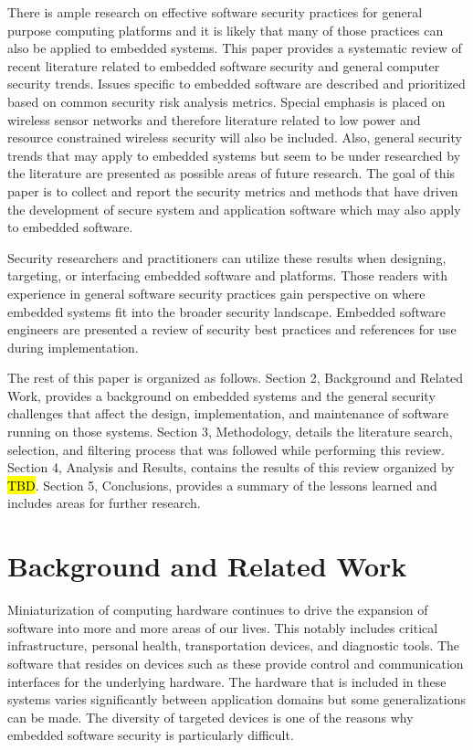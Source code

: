 \documentclass[final,conference,10pt]{IEEEtran}
\begin{document}
There is ample research on effective software security practices for general purpose computing platforms and it is likely that many of those practices can also be applied to embedded systems. This paper provides a systematic review of recent literature related to embedded software security and general computer security trends. Issues specific to embedded software are described and prioritized based on common security risk analysis metrics.  Special emphasis is placed on wireless sensor networks and therefore literature related to low power and resource constrained wireless security will also be included.  Also, general security trends that may apply to embedded systems but seem to be under researched by the literature are presented as possible areas of future research.  The goal of this paper is to collect and report the security metrics and methods that have driven the development of secure system and application software which may also apply to embedded software.

Security researchers and practitioners can utilize these results when designing, targeting, or interfacing embedded software and platforms.  Those readers with experience in general software security practices gain perspective on where embedded systems fit into the broader security landscape.  Embedded software engineers are presented a review of security best practices and references for use during implementation.

The rest of this paper is organized as follows. Section 2, Background and Related Work, provides a background on embedded systems and the general security challenges that affect the design, implementation, and maintenance of software running on those systems. Section 3, Methodology, details the literature search, selection, and filtering process that was followed while performing this review. Section 4, Analysis and Results, contains the results of this review organized by \hl{TBD}. Section 5, Conclusions, provides a summary of the lessons learned and includes areas for further research.

\section{Background and Related Work}
Miniaturization of computing hardware continues to drive the expansion of software into more and more areas of our lives.  This notably includes critical infrastructure, personal health, transportation devices, and diagnostic tools.  The software that resides on devices such as these provide control and communication interfaces for the underlying hardware.  The hardware that is included in these systems varies significantly between application domains but some generalizations can be made.  The diversity of targeted devices is one of the reasons why embedded software security is particularly difficult.
\end{document}
